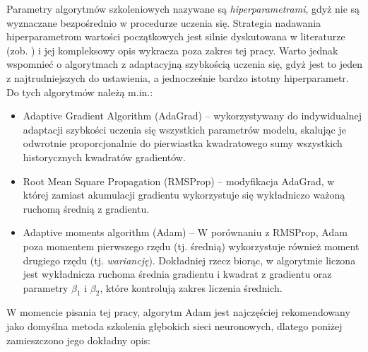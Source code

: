 Parametry algorytmów szkoleniowych nazywane są \textit{hiperparametrami}, gdyż nie są wyznaczane bezpośrednio w procedurze uczenia się. Strategia nadawania hiperparametrom wartości początkowych jest silnie dyskutowana w literaturze (zob. \cite{Koch2017AutomatedHT}) i jej kompleksowy opis wykracza poza zakres tej pracy. Warto jednak wspomnieć o algorytmach z adaptacyjną szybkością uczenia się, gdyż jest to jeden z najtrudniejszych do ustawienia, a jednocześnie bardzo istotny hiperparametr. Do tych algorytmów należą m.in.:
\begin{itemize}[noitemsep,nolistsep]
 \item Adaptive Gradient Algorithm (AdaGrad) \cite{Duchi:2011:ASM:1953048.2021068} -- wykorzystywany do indywidualnej adaptacji szybkości uczenia się wszystkich parametrów modelu, skalując je odwrotnie proporcjonalnie do pierwiastka kwadratowego sumy wszystkich historycznych kwadratów gradientów.
 \item Root Mean Square Propagation (RMSProp) \cite{SCHMIDHUBER201585} -- modyfikacja AdaGrad, w której zamiast akumulacji gradientu wykorzystuje się wykładniczo ważoną ruchomą średnią z gradientu.
 \item Adaptive moments algorithm (Adam) \cite{DBLP:journals/corr/KingmaB14} -- W porównaniu z RMSProp, Adam poza momentem pierwszego rzędu (tj. średnią) wykorzystuje również moment drugiego rzędu (tj. \textit{wariancję}). Dokładniej rzecz biorąc, w algorytmie liczona jest wykładnicza ruchoma średnia gradientu i kwadrat z gradientu oraz parametry $\beta_1$ i $\beta_2$, które kontrolują zakres liczenia średnich.
\end{itemize}
W momencie pisania tej pracy, algorytm Adam jest najczęściej rekomendowany jako domyślna metoda szkolenia głębokich sieci neuronowych, dlatego poniżej zamieszczono jego dokładny opis:
